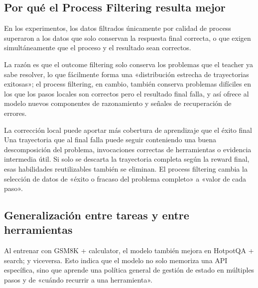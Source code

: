 \documentclass[a4paper]{article}
\begin{document}
\subsection{Por qué el Process Filtering resulta mejor}

En los experimentos, los datos filtrados únicamente por calidad de process superaron a los datos que solo conservan la respuesta final correcta, o que exigen simultáneamente que el proceso y el resultado sean correctos.


La razón es que el outcome filtering solo conserva los problemas que el teacher ya sabe resolver, lo que fácilmente forma una «distribución estrecha de trayectorias exitosas»; el process filtering, en cambio, también conserva problemas difíciles en los que los pasos locales son correctos pero el resultado final falla, y así ofrece al modelo nuevos componentes de razonamiento y señales de recuperación de errores.

\begin{importantbox}{La corrección local puede aportar más cobertura de aprendizaje que el éxito final}
Una trayectoria que al final falla puede seguir conteniendo una buena descomposición del problema, invocaciones correctas de herramientas o evidencia intermedia útil. Si solo se descarta la trayectoria completa según la reward final, esas habilidades reutilizables también se eliminan. El process filtering cambia la selección de datos de «éxito o fracaso del problema completo» a «valor de cada paso».
\end{importantbox}

\subsection{Generalización entre tareas y entre herramientas}

Al entrenar con GSM8K + calculator, el modelo también mejora en HotpotQA + search; y viceversa. Esto indica que el modelo no solo memoriza una API específica, sino que aprende una política general de gestión de estado en múltiples pasos y de «cuándo recurrir a una herramienta».

\end{document}
